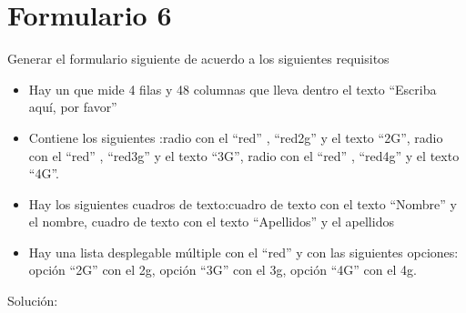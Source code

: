 \documentclass[letterpaper,10pt,spanish]{sphinxmanual}
\begin{document}
\section{Formulario 6}
\label{ejercicios/formularios/anexo_formularios:formulario-6}
Generar el formulario siguiente de acuerdo a los siguientes requisitos
\begin{itemize}
\item {} 
Hay un  que mide 4 filas y 48 columnas que lleva dentro el texto ``Escriba aquí, por favor''

\item {} 
Contiene los siguientes :radio con el   ``red'' ,   ``red2g''  y el texto ``2G'', radio con el   ``red'' ,   ``red3g''  y el texto ``3G'', radio con el   ``red'' ,   ``red4g''  y el texto ``4G''.

\item {} 
Hay los siguientes cuadros de texto:cuadro de texto con el texto ``Nombre'' y el  nombre, cuadro de texto con el texto ``Apellidos'' y el  apellidos

\item {} 
Hay una lista desplegable múltiple con el  ``red'' y con las siguientes opciones: opción ``2G'' con el  2g, opción ``3G'' con el  3g, opción ``4G'' con el  4g.

\end{itemize}


Solución:
\end{document}
